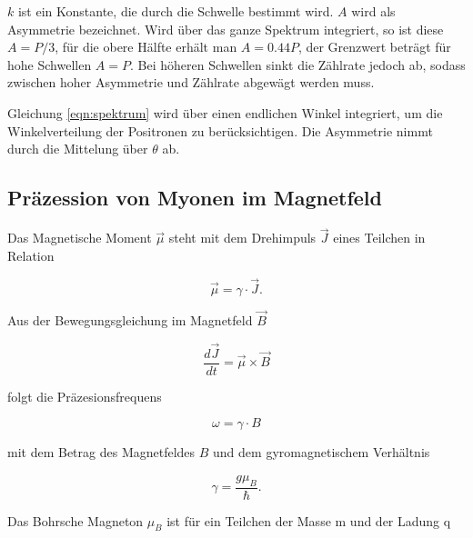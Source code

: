 \documentclass[a4paper,ngerman]{scrartcl}
\begin{document}
$k$ ist ein Konstante, die durch die Schwelle bestimmt wird. $A$ wird als Asymmetrie bezeichnet. Wird über das ganze Spektrum integriert, so ist diese $A=P/3$, für die obere Hälfte erhält man $A = 0.44 P$, der Grenzwert beträgt für hohe Schwellen $A=P$. Bei höheren Schwellen sinkt die Zählrate jedoch ab, sodass zwischen hoher Asymmetrie und Zählrate abgewägt werden muss.

Gleichung \ref{eqn:spektrum} wird über einen endlichen Winkel integriert, um die Winkelverteilung der Positronen zu berücksichtigen. Die Asymmetrie nimmt durch die Mittelung über $\theta$ ab.







\subsection{Präzession von Myonen im Magnetfeld}
\label{sec:prazission}

Das Magnetische Moment $\vec{\mu}$ steht mit dem Drehimpuls $\vec{J}$ eines Teilchen in Relation

\begin{equation}
\vec{\mu} = \gamma \cdot \vec{J} .
\end{equation}

Aus der Bewegungsgleichung im Magnetfeld $\vec{B}$

\begin{equation}
\frac{d\vec{J}}{dt} = \vec{\mu} \times \vec{B}
\end{equation}

folgt die Präzesionsfrequens

\begin{equation}
\omega = \gamma \cdot B
\end{equation}

mit dem Betrag des Magnetfeldes $B$ und dem gyromagnetischem Verhältnis 

\begin{equation}
\label{eqn:praez_gyro}
\gamma = \frac{g \mu_B}{\hbar}. 
\end{equation}

Das Bohrsche Magneton $\mu_B$ ist für ein Teilchen der Masse m und der Ladung q
\end{document}
